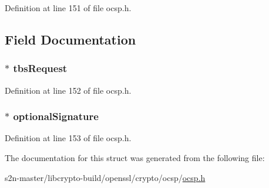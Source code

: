 Definition at line 151 of file ocsp.\+h.



\subsection{Field Documentation}
\subsubsection[{\texorpdfstring{tbs\+Request}{tbsRequest}}]{ $\ast$ tbs\+Request}\hypertarget{structocsp__request__st_a5dfaf47cf2792320b373a320772adbd4}{}\label{structocsp__request__st_a5dfaf47cf2792320b373a320772adbd4}


Definition at line 152 of file ocsp.\+h.

\subsubsection[{\texorpdfstring{optional\+Signature}{optionalSignature}}]{ $\ast$ optional\+Signature}\hypertarget{structocsp__request__st_adbe38ae06d8f047fa589f9acf8d02779}{}\label{structocsp__request__st_adbe38ae06d8f047fa589f9acf8d02779}


Definition at line 153 of file ocsp.\+h.



The documentation for this struct was generated from the following file\+:\begin{DoxyCompactItemize}
\item 
s2n-\/master/libcrypto-\/build/openssl/crypto/ocsp/\hyperlink{crypto_2ocsp_2ocsp_8h}{ocsp.\+h}\end{DoxyCompactItemize}
